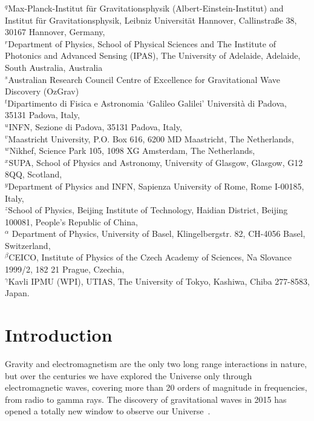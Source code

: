 \documentclass[11pt,a4paper]{article}
\begin{document}
\begin{center}
{{$^q${Max-Planck-Institut f{\"u}r Gravitationsphysik (Albert-Einstein-Institut) and Institut f{\"u}r Gravitationsphysik, Leibniz Universit{\"a}t Hannover, Callinstra{\ss}e 38, 30167 Hannover, Germany}, \\
$^r${Department of Physics, School of Physical Sciences and The Institute of Photonics and Advanced Sensing (IPAS), The University of Adelaide, Adelaide, South Australia, Australia} \\
$^s${Australian Research Council Centre of Excellence for Gravitational Wave Discovery (OzGrav)} \\
$^t${Dipartimento di Fisica e Astronomia `Galileo Galilei' Universit\`a di Padova, 35131 Padova, Italy},\\
$^u${INFN, Sezione di Padova, 35131 Padova, Italy}, \\
$^v${Maastricht University, P.O. Box 616, 6200 MD Maastricht, The Netherlands}, \\
$^w${Nikhef, Science Park 105, 1098 XG Amsterdam, The Netherlands}, \\
$^x${SUPA, School of Physics and Astronomy, University of Glasgow, Glasgow, G12 8QQ, Scotland}, \\
$^y${Department of Physics and INFN, Sapienza University of Rome, Rome I-00185, Italy}, \\
$^z${School of Physics, Beijing Institute of Technology, Haidian District, Beijing 100081, People’s Republic of China}, \\
$^\alpha$ {Department of Physics, University of Basel, Klingelbergstr. 82, CH-4056 Basel, Switzerland}, \\
$^\beta${CEICO, Institute of Physics of the Czech Academy of Sciences, Na Slovance 1999/2, 182 21 Prague, Czechia}, \\
$^\gamma${Kavli IPMU (WPI), UTIAS, The University of Tokyo, Kashiwa, Chiba 277-8583, Japan}.}}
\end{center}

\vskip 1cm

\renewcommand*{\thefootnote}{\arabic{footnote}}
\setcounter{footnote}{0}



\newpage
\tableofcontents

\section{Introduction}
\label{sec:intro}
Gravity and electromagnetism are the only two long range interactions in nature, but over the centuries we have explored the Universe only through electromagnetic waves, covering more than 20 orders of magnitude in frequencies, from radio to gamma rays. The discovery of gravitational waves in 2015 has opened a totally new window to observe our Universe~\cite{Abbott:2016blz}.
\end{document}

